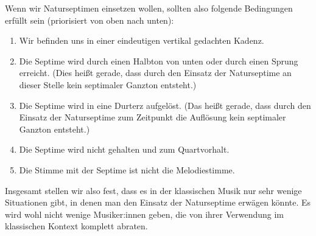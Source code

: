 Wenn wir Naturseptimen einsetzen wollen, sollten also folgende Bedingungen
erfüllt sein (priorisiert von oben nach unten):

\begin{enumerate}
\item Wir befinden uns in einer eindeutigen vertikal gedachten Kadenz.
\item Die Septime wird durch einen Halbton von unten oder durch einen Sprung
  erreicht. (Dies heißt gerade, dass durch den Einsatz der Naturseptime an
  dieser Stelle kein septimaler Ganzton entsteht.)
\item Die Septime wird in eine Durterz aufgelöst. (Das heißt gerade, dass durch
  den Einsatz der Naturseptime zum Zeitpunkt die Auflösung kein septimaler
  Ganzton entsteht.)
\item Die Septime wird nicht gehalten und zum Quartvorhalt.
\item Die Stimme mit der Septime ist nicht die Melodiestimme.
\end{enumerate}

Insgesamt stellen wir also fest, dass es in der klassischen Musik nur sehr
wenige Situationen gibt, in denen man den Einsatz der Naturseptime erwägen
könnte.  Es wird wohl nicht wenige Musiker:innen geben, die von ihrer Verwendung
im klassischen Kontext komplett abraten. 

